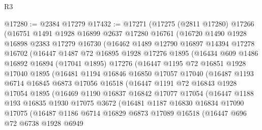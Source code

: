 \begin{lexlean}{R3}
\begin{coremodule}
@17280 := @2384 @17279
@17432 := @17271
    (@17275
      (@2811 @17280)
      @17266
      (@16751
        @1491
        @1928
        @16899
        @2637
        @17280
        @16761
        (@16720
          @1490
          @1928
          @16898
          @2383
          @17279
          @16730
          (@16462
            @1489
            @12790
            @16897
            @14394
            @17278
            @16702
            (@16447
              @1487
              @72
              @16895
              @1928
              @17276
              @1895
              (@16434
                @609
                @1486
                @16892
                @16894
                (@17041 @1895)
                @17276
                (@16447
                  @1195
                  @72
                  @16851
                  @1928
                  @17040
                  @1895
                  (@16481
                    @1194
                    @16846
                    @16850
                    @17057
                    @17040
                    (@16487
                      @1193
                      @6714
                      @16845
                      @6873
                      @17056
                      @16518
                      (@16447
                        @1191
                        @72
                        @16843
                        @1928
                        @17054
                        @1895
                        (@16469
                          @1190
                          @16837
                          @16842
                          @17077
                          @17054
                          (@16447
                            @1188
                            @193
                            @16835
                            @1930
                            @17075
                            @3672
                            (@16481
                              @1187
                              @16830
                              @16834
                              @17090
                              @17075
                              (@16487
                                @1186
                                @6714
                                @16829
                                @6873
                                @17089
                                @16518
                                (@16447
                                  @696
                                  @72
                                  @6738
                                  @1928
                                  @6949

\end{coremodule}
\end{lexlean}
